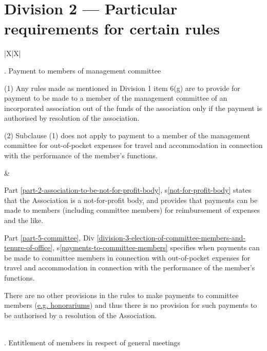 \documentclass[../constitution.tex]{subfiles}
\begin{document}
\pagebreak

\section*{Division 2 — Particular requirements for certain rules }


 {\def\arraystretch{1.3}
  \begin{xltabular}{\textwidth}{ |X|X| }

      . Payment to members of management committee

      \bigskip

      (1) Any rules made as mentioned in Division 1 item 6(g) are to provide
      for payment to be made to a member of the management committee of
      an incorporated association out of the funds of the association only if
      the payment is authorised by resolution of the association.

      \bigskip

      (2) Subclause (1) does not apply to payment to a member of the
      management committee for out-of-pocket expenses for travel and
      accommodation in connection with the performance of the member's
      functions.

      &

      Part \ref{part-2-association-to-be-not-for-profit-body}, s\ref{not-for-profit-body} states that the Association is a not-for-profit body, and provides that payments can be made to members (including committee members) for reimbursement of expenses and the like.

      \bigskip

      Part \ref{part-5-committee}, Div \ref{division-3-election-of-committee-members-and-tenure-of-office}, s\ref{payments-to-committee-members} specifies when payments can be made to committee members in connection with out-of-pocket expenses for travel and accommodation in connection with the performance of the member's functions.

      \bigskip

      There are no other provisions in the rules to make payments to committee members (\href{https://www.commerce.wa.gov.au/books/inc-guide-incorporated-associations-western-australia/paying-committee-members}{e.g. honorariums}) and thus there is no provision for such payments to be authorised by a resolution of the Association.

      \\

      . Entitlement of members in respect of general meetings


\end{xltabular}}
\end{document}
